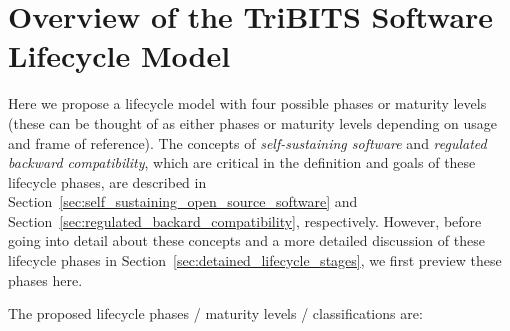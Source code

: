 \documentclass[11pt]{SANDreport}
\begin{document}
%
{}\section{Overview of the TriBITS Software Lifecycle Model}
\label{sec:life_cycle_overview}
%

Here we propose a lifecycle model with four possible phases or maturity levels (these can be thought of as either phases or maturity levels depending on usage and frame of reference).  The concepts of \textit{self-sustaining software} and \textit{regulated backward compatibility}, which are critical in the definition and goals of these lifecycle phases, are described in Section~\ref{sec:self_sustaining_open_source_software} and Section~\ref{sec:regulated_backard_compatibility}, respectively. However, before going into detail about these concepts and a more detailed discussion of these lifecycle phases in Section~\ref{sec:detained_lifecycle_stages}, we first preview these phases here.

The proposed lifecycle phases / maturity levels / classifications are:
\end{document}
